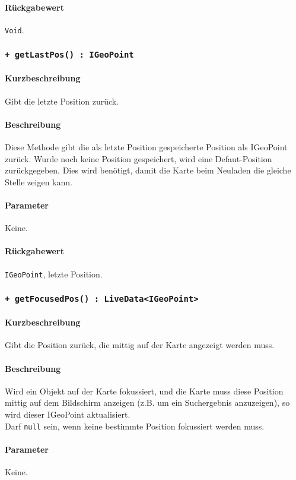 \paragraph*{Rückgabewert}
\texttt{Void}.

\subsubsection*{\texttt{+ getLastPos() : IGeoPoint}}%
\paragraph*{Kurzbeschreibung}
Gibt die letzte Position zurück.
\paragraph*{Beschreibung}
Diese Methode gibt die als letzte Position gespeicherte Position als IGeoPoint zurück.
Wurde noch keine Position gespeichert, wird eine Defaut-Position zurückgegeben.
Dies wird benötigt, damit die Karte beim Neuladen die gleiche Stelle zeigen kann.
\paragraph*{Parameter}
Keine.
\paragraph*{Rückgabewert}
\texttt{IGeoPoint}, letzte Position.

\subsubsection*{\texttt{+ getFocusedPos() : LiveData<IGeoPoint>}}%
\paragraph*{Kurzbeschreibung}
Gibt die Position zurück, die mittig auf der Karte angezeigt werden muss.
\paragraph*{Beschreibung}
Wird ein Objekt auf der Karte fokussiert, und die Karte muss diese Position mittig auf dem 
Bildschirm anzeigen (z.B. um ein Suchergebnis anzuzeigen), so wird dieser IGeoPoint aktualisiert.\\
Darf \texttt{null} sein, wenn keine bestimmte Position fokussiert werden muss.
\paragraph*{Parameter}
Keine.
